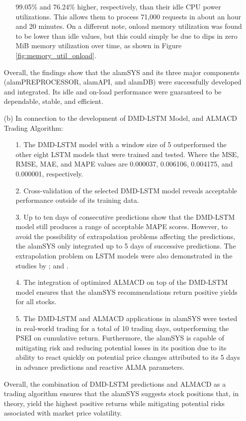 \begin{itemize}
\begin{itemize}
            99.05\% and 76.24\% higher, respectively, than their idle CPU power 
            utilizations. This allows them to process 71,000 requests in about 
            an hour and 20 minutes. On a different note, onload memory utilization was 
            found to be lower than idle values, but this could simply be due to dips in 
            zero MiB memory utilization over time, as shown in Figure \ref{fig:memory_util_onload}.
        \end{itemize}
        Overall, the findings show that the alamSYS and its three major components 
        (alamPREPROCESSOR, alamAPI, and alamDB) were successfully developed and integrated. 
        Its idle and on-load performance were guaranteed to be dependable, stable, and efficient.
        \hfill \\

    \item[(b)] In connection to the development of DMD-LSTM Model, and ALMACD Trading Algorithm:
        \begin{itemize}
            \item[1.] The DMD-LSTM model with a window size of 5 outperformed the other eight 
            LSTM models that were trained and tested. 
            Where the MSE, RMSE, MAE, and MAPE values are 0.000037, 0.006106, 0.004175, and 0.000001,
            respectively.
            \item[2.] Cross-validation of the selected DMD-LSTM model reveals acceptable 
            performance outside of its training data.
            \item[3.] Up to ten days of consecutive predictions show that the DMD-LSTM model 
            still produces a range of acceptable MAPE scores. However, to avoid the possibility of 
            extrapolation problems affecting the predictions, the alamSYS only integrated up to 5 days of 
            successive predictions. The extrapolation problem on LSTM models were also demonstrated in the 
            studies by ; and .
            \item[4.] The integration of optimized ALMACD on top of the DMD-LSTM model ensures that the alamSYS 
            recommendations return positive yields for all stocks.
            \item[5.] The DMD-LSTM and ALMACD applications in alamSYS were tested in real-world trading for a total 
            of 10 trading days, outperforming the PSEI on cumulative return. Furthermore, the alamSYS is capable 
            of mitigating risk and reducing potential losses in its position due to its ability to react quickly 
            on potential price changes attributed to its 5 days in advance predictions and reactive ALMA parameters.
        \end{itemize}
        Overall, the combination of DMD-LSTM predictions and ALMACD as a trading algorithm ensures that the alamSYS 
        suggests stock positions that, in theory, yield the highest positive returns while mitigating potential risks 
        associated with market price volatility.
        \hfill \\


\end{itemize}
